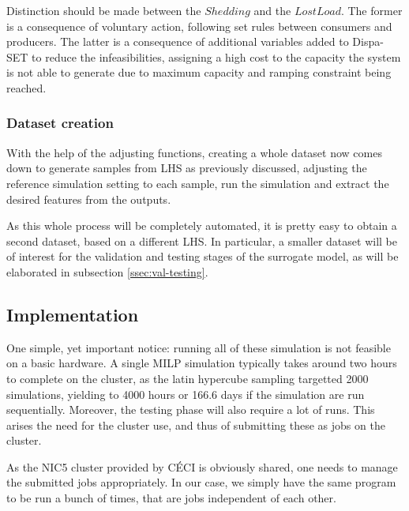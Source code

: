 Distinction should be made between the $Shedding$ and the $LostLoad$. The former is a consequence of voluntary action, following set rules between consumers and producers. The latter is a consequence of additional variables added to Dispa-SET to reduce the infeasibilities, assigning a high cost to the capacity the system is not able to generate due to maximum capacity and ramping constraint being reached.

\subsubsection{Dataset creation}

With the help of the adjusting functions, creating a whole dataset now comes down to generate samples from LHS as previously discussed, adjusting the reference simulation setting to each sample, run the simulation and extract the desired features from the outputs.

As this whole process will be completely automated, it is pretty easy to obtain a second dataset, based on a different LHS. In particular, a smaller dataset will be of interest for the validation and testing stages of the surrogate model, as will be elaborated in subsection \ref{ssec:val-testing}.

\subsection{Implementation}

One simple, yet important notice: running all of these simulation is not feasible on a basic hardware. A single MILP simulation typically takes around two hours to complete on the cluster, as the latin hypercube sampling targetted 2000 simulations, yielding to 4000 hours or 166.6 days if the simulation are run sequentially. Moreover, the testing phase will also require a lot of runs. This arises the need for the cluster use, and thus of submitting these as jobs on the cluster.

As the NIC5 cluster provided by CÉCI is obviously shared, one needs to manage the submitted jobs appropriately. In our case, we simply have the same program to be run a bunch of times, that are jobs independent of each other.

